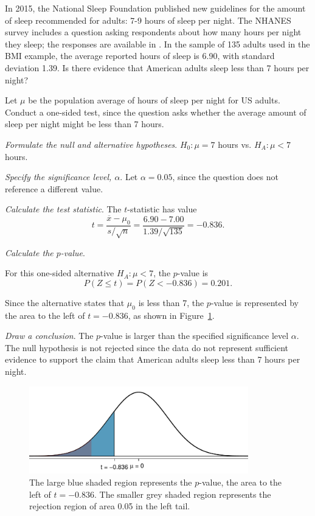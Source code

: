 \begin{examplewrap}
\begin{nexample}{In 2015, the National Sleep Foundation published new guidelines for the amount of sleep recommended for adults: 7-9 hours of sleep per night.\footnotemark{} The NHANES survey includes a question asking respondents about how many hours per night they sleep; the responses are available in . In the sample of 135 adults used in the BMI example, the average reported hours of sleep is 6.90, with standard deviation 1.39. Is there evidence that American adults sleep less than 7 hours per night?}

Let $\mu$ be the population average of hours of sleep per night for US adults. Conduct a one-sided test, since the question asks whether the average amount of sleep per night might be less than 7 hours. 

\textit{Formulate the null and alternative hypotheses}. $H_0: \mu = 7$ hours vs. $H_A: \mu < 7$ hours.

\textit{Specify the significance level, $\alpha$}.  Let $\alpha = 0.05$, since the question does not reference a different value. 

\textit{Calculate the test statistic}. The $t$-statistic has value
\[t = \frac{\overline{x}-\mu_0}{s/\sqrt{n}} = \frac{6.90 - 7.00} {1.39/\sqrt{135}} = -0.836.\]

\textit{Calculate the $p$-value}.

For this one-sided alternative $H_A: \mu < 7$, the $p$-value is
\[P(Z \leq t) = P(Z < -0.836) = 0.201.\]

Since the alternative states that $\mu_0$ is less than 7, the $p$-value is represented by the area to the left of $t = -0.836$, as shown in Figure~\ref{pValueSleep}.

\textit{Draw a conclusion}.  The $p$-value is larger than the specified significance level $\alpha$. The null hypothesis is not rejected since the data do not represent sufficient evidence to support the claim that American adults sleep less than 7 hours per night.
\end{nexample}
\end{examplewrap}

\textD{\newpage}

\begin{figure}[h]
	\centering
	\includegraphics[width=0.85\textwidth]{ch_inference_foundations_oi_biostat/figures/pValueSleep/pValueSleep}
	\caption{The large blue shaded region represents the $p$-value, the area to the left of $t = -0.836$. The smaller grey shaded region represents the rejection region of area 0.05 in the left tail.}
	\label{pValueSleep}
\end{figure}


